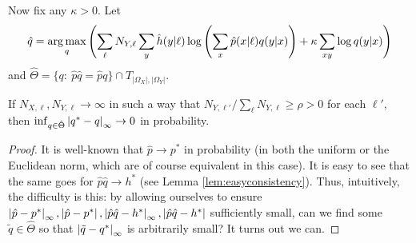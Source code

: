 Now fix any $\kappa>0$.  Let
\begin{align}
\hat q = \operatorname*{arg\,max}_q \left(\sum_\ell N_{Y,\ell}\sum_{y}\hat h(y|\ell)\log\left(\sum_{x}\hat p(x|\ell)q(y|x)\right) + \kappa \sum_{xy} \log q(y|x)\right)\label{eq:mindef}
\end{align}
and $\hat \Theta=\{q:\ \hat p\hat q=\hat pq\} \cap T_{|\Omega_X|,|\Omega_Y|}$.  
\vspace{.1in}
\begin{thm}
If $N_{X,\ell},N_{Y,\ell}\rightarrow \infty$ in such a way that $N_{Y,\ell'}/\sum_{\ell}N_{Y,\ell} \geq \rho>0$ for each $\ell'$, then $\inf_{q\in \hat\Theta} \left|q^*-q\right|_\infty\rightarrow 0$ in probability.
\end{thm}

\begin{proof}
It is well-known that $\hat p\rightarrow p^*$ in probability (in both the uniform or the Euclidean norm, which are of course equivalent in this case).  It is easy to see that the same goes for $\hat p\hat q\rightarrow h^*$ (see Lemma \ref{lem:easyconsistency}).  Thus, intuitively, the difficulty is this: by allowing ourselves to ensure $\left|\hat p - p^*\right|_\infty,\left|\hat p - p^*\right|,\left|\hat p\hat q - h^*\right|_\infty,\left|\hat p\hat q - h^*\right|$ sufficiently small, can we find some $\tilde q\in \hat \Theta$ so that $\left|\tilde q - q^*\right|_\infty$ is arbitrarily small?  It turns out we can.


\end{proof}
